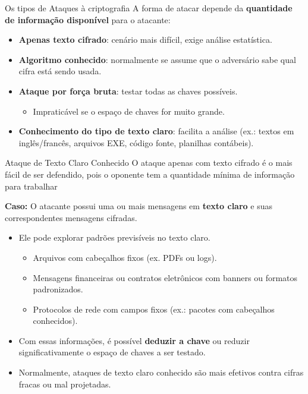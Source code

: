 \begin{frame}{Os tipos de Ataques à criptografia}
A forma de atacar depende da \textbf{quantidade de informação disponível} para o atacante:

\begin{itemize}
    \item \textbf{Apenas texto cifrado}: cenário mais difícil, exige análise estatística.  
    \item \textbf{Algoritmo conhecido}: normalmente se assume que o adversário sabe qual cifra está sendo usada.  
    \item \textbf{Ataque por força bruta}: testar todas as chaves possíveis.  
        \begin{itemize}
            \item Impraticável se o espaço de chaves for muito grande.  
        \end{itemize}
    \item \textbf{Conhecimento do tipo de texto claro}: facilita a análise (ex.: textos em inglês/francês, arquivos EXE, código fonte, planilhas contábeis).  
\end{itemize}
\end{frame}


\begin{frame}{Ataque de Texto Claro Conhecido }
O ataque apenas com texto cifrado é o mais fácil de ser defendido, pois o oponente tem a quantidade mínima de informação para trabalhar

 \textbf{Caso:} O atacante possui uma ou mais mensagens em \textbf{texto claro} e suas correspondentes mensagens cifradas.
\begin{itemize}
    \item Ele pode explorar padrões previsíveis no texto claro.  
        \begin{itemize}
            \item Arquivos com cabeçalhos fixos (ex. PDFs ou logs).  
            \item Mensagens financeiras ou contratos eletrônicos com banners ou formatos padronizados.  
            \item Protocolos de rede com campos fixos (ex.: pacotes com cabeçalhos conhecidos).  
        \end{itemize}
    \item Com essas informações, é possível \textbf{deduzir a chave} ou reduzir significativamente o espaço de chaves a ser testado.  
    \item Normalmente, ataques de texto claro conhecido são mais efetivos contra cifras fracas ou mal projetadas.  
    \end{itemize}

\end{frame}

